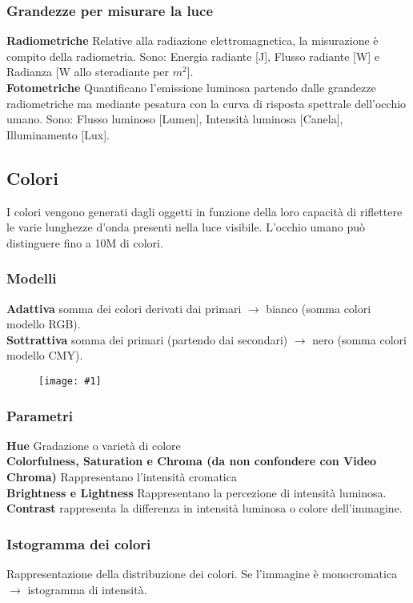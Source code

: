\documentclass[8pt,a4paper]{article}
\newcommand{\f}[1]{
      \begin{figure}[H]
        \center
      \texttt{[image: \#1]}
      \end{figure}
}
\begin{document}
\begin{multicols}{5}
    \subsubsection{Grandezze per misurare la luce}
    \textbf{Radiometriche} Relative alla radiazione elettromagnetica, 
    la misurazione è compito della radiometria. Sono: Energia radiante [J],
    Flusso radiante [W] e Radianza [W allo  steradiante per $m^2$]. \\
    \noindent
    \textbf{Fotometriche} Quantificano l’emissione luminosa partendo dalle 
    grandezze radiometriche ma mediante pesatura con la curva di risposta 
    spettrale dell’occhio umano. Sono: Flusso luminoso [Lumen], Intensità 
    luminosa [Canela], Illuminamento [Lux].

    \subsection{Colori}
    I colori vengono generati dagli oggetti in funzione della loro capacità
    di riflettere le varie lunghezze d’onda presenti nella luce visibile.
    L'occhio umano può distinguere fino a 10M di colori. \\
    \subsubsection{Modelli}
    \textbf{Adattiva} somma dei colori derivati dai primari $\rightarrow$ bianco 
    (somma colori modello RGB). \\ 
    \textbf{Sottrattiva} somma dei primari (partendo dai secondari) $\rightarrow$ nero 
    (somma colori modello CMY). \\
    \f{color-mode}
    \subsubsection{Parametri}
    \textbf{Hue} Gradazione o varietà di colore\\
    \textbf{Colorfulness, Saturation e Chroma (da non confondere con Video Chroma)}
    Rappresentano l'intensità cromatica\\
    \textbf{Brightness e Lightness} Rappresentano la percezione di intensità luminosa.\\
    \textbf{Contrast} rappresenta la differenza in intensità luminosa o colore dell'immagine.
    \subsubsection{Istogramma dei colori}
    Rappresentazione della distribuzione dei colori. Se l'immagine è monocromatica
    $\rightarrow $ istogramma di intensità.


\end{multicols}
\end{document}
